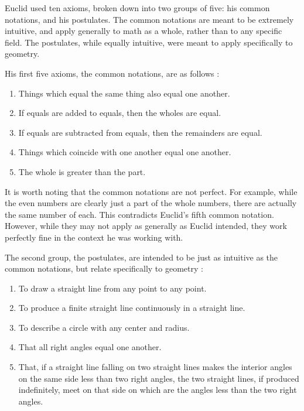\documentclass[12pt]{article}
\begin{document}
Euclid used ten axioms, broken down into two groups of five: his common notations, and his postulates. The common notations are meant to be extremely intuitive, and apply generally to math as a whole, rather than to any specific field.  The postulates, while equally intuitive, were meant to apply specifically to geometry.

His first five axioms, the common notations, are as follows  \cite{elements}:
\begin{enumerate}
\item Things which equal the same thing also equal one another.

\item If equals are added to equals, then the wholes are equal.

\item If equals are subtracted from equals, then the remainders are equal.

\item Things which coincide with one another equal one another.

\item The whole is greater than the part.
\end{enumerate}

It is worth noting that the common notations are not perfect. For example, while the even numbers are clearly just a part of the whole numbers, there are actually the same number of each. This contradicts Euclid's fifth common notation. However, while they may not apply as generally as Euclid intended, they work perfectly fine in the context he was working with.

The second group, the postulates, are intended to be just as intuitive as the common notations, but relate specifically to geometry \cite{elements}:
\begin{enumerate}
\item To draw a straight line from any point to any point.

\item To produce a finite straight line continuously in a straight line.

\item To describe a circle with any center and radius.

\item That all right angles equal one another.

\item That, if a straight line falling on two straight lines makes the interior angles on the same side less than two right angles, the two straight lines, if produced indefinitely, meet on that side on which are the angles less than the two right angles.
\end{enumerate}
\end{document}
